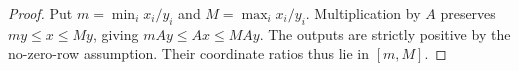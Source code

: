 \begin{proof}
Put $m=\min_i x_i/y_i$ and $M=\max_i x_i/y_i$. Multiplication by $A$
preserves $my\le x\le My$, giving $mAy\le Ax\le MAy$.
The outputs are strictly positive by the no-zero-row assumption.
Their coordinate ratios thus lie in $[m,M]$.
\end{proof}
